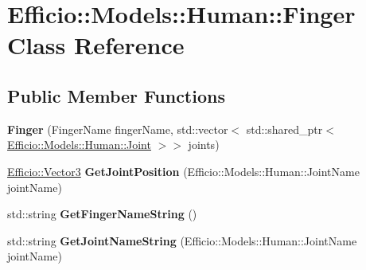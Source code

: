\hypertarget{class_efficio_1_1_models_1_1_human_1_1_finger}{}\section{Efficio\+:\+:Models\+:\+:Human\+:\+:Finger Class Reference}
\label{class_efficio_1_1_models_1_1_human_1_1_finger}
\subsection*{Public Member Functions}
\begin{DoxyCompactItemize}
\item 
{\bfseries Finger} (Finger\+Name finger\+Name, std\+::vector$<$ std\+::shared\+\_\+ptr$<$ \hyperlink{class_efficio_1_1_models_1_1_human_1_1_joint}{Efficio\+::\+Models\+::\+Human\+::\+Joint} $>$$>$ joints)\hypertarget{class_efficio_1_1_models_1_1_human_1_1_finger_a5f17aad32b82c1af07846b30277ac9ab}{}\label{class_efficio_1_1_models_1_1_human_1_1_finger_a5f17aad32b82c1af07846b30277ac9ab}

\item 
\hyperlink{class_efficio_1_1_vector3}{Efficio\+::\+Vector3} {\bfseries Get\+Joint\+Position} (Efficio\+::\+Models\+::\+Human\+::\+Joint\+Name joint\+Name)\hypertarget{class_efficio_1_1_models_1_1_human_1_1_finger_a4c10fccb5ca87b762fe6752ec24d5052}{}\label{class_efficio_1_1_models_1_1_human_1_1_finger_a4c10fccb5ca87b762fe6752ec24d5052}

\item 
std\+::string {\bfseries Get\+Finger\+Name\+String} ()\hypertarget{class_efficio_1_1_models_1_1_human_1_1_finger_aaef48fbc391d379b8d0417cac6229754}{}\label{class_efficio_1_1_models_1_1_human_1_1_finger_aaef48fbc391d379b8d0417cac6229754}

\item 
std\+::string {\bfseries Get\+Joint\+Name\+String} (Efficio\+::\+Models\+::\+Human\+::\+Joint\+Name joint\+Name)\hypertarget{class_efficio_1_1_models_1_1_human_1_1_finger_ac061a5c711691cc4434e0d861ec8a684}{}\label{class_efficio_1_1_models_1_1_human_1_1_finger_ac061a5c711691cc4434e0d861ec8a684}

\end{DoxyCompactItemize}
